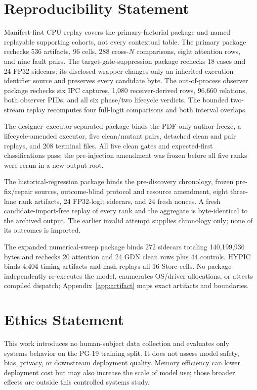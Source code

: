 \documentclass{article}
\begin{document}
\section{Reproducibility Statement}
\label{app:reproducibility}

Manifest-first CPU replay covers the primary-factorial package and named
replayable supporting cohorts, not every contextual table.  The primary package
rechecks 536 artifacts, 96 cells, 288 cross-$N$ comparisons, eight attention
rows, and nine fault pairs.  The target-gate-suppression package rechecks 18
cases and 24 FP32 sidecars; its disclosed wrapper changes only an inherited
execution-identifier source and preserves every candidate byte.  The
out-of-process observer package rechecks six IPC captures, 1,080
receiver-derived rows, 96,660 relations, both observer PIDs, and all six
phase/two lifecycle verdicts.  The bounded two-stream replay recomputes four
full-logit comparisons and both interval overlaps.

The designer--executor-separated package binds the PDF-only author freeze, a
lifecycle-amended executor, five clean/mutant pairs, detached clean and pair
replays, and 208 terminal files.  All five clean gates and expected-first
classifications pass; the pre-injection amendment was frozen before all five
ranks were rerun in a new output root.

The historical-regression package binds the pre-discovery chronology, frozen
pre-fix/repair sources, outcome-blind protocol and resource amendment, eight
three-lane rank artifacts, 24 FP32-logit sidecars, and 24 fresh nonces.  A fresh
candidate-import-free replay of every rank and the aggregate is byte-identical
to the archived output.  The earlier invalid attempt supplies chronology only;
none of its outcomes is imported.

The expanded numerical-sweep package binds 272 sidecars totaling 140,199,936
bytes and rechecks 20 attention and 24 GDN clean rows plus 44 controls.  HYPIC
binds 4,404 timing artifacts and
hash-replays all 16 Store cells.  No package independently re-executes the
model, enumerates OS/driver allocations, or attests compiled dispatch;
Appendix~\ref{app:artifact} maps exact artifacts and boundaries.

\section{Ethics Statement}

This work introduces no human-subject data collection and evaluates only
systems behavior on the PG-19 training split.  It does not assess model safety,
bias, privacy, or downstream deployment quality.  Memory efficiency can lower
deployment cost but may also increase the scale of model use; those broader
effects are outside this controlled systems study.
\end{document}
